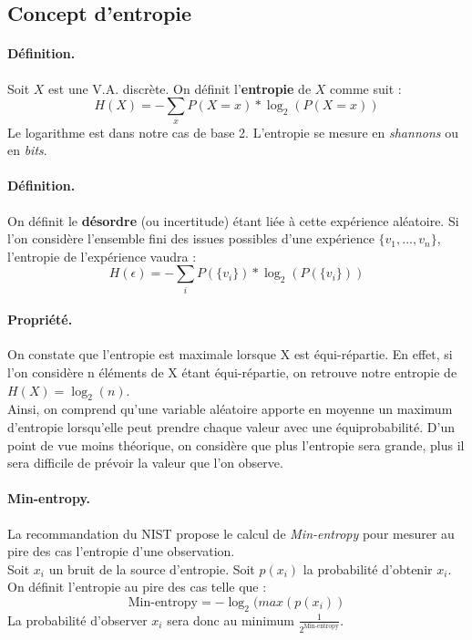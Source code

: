 \subsection{Concept d'entropie}
\paragraph{Définition.\\}
Soit $X$ est une V.A. discrète. On définit l'\textbf{entropie} de $X$ comme suit : 
$$H(X) = - \sum_x P(X=x)*\log_2(P(X=x))	 $$ 
Le logarithme est dans notre cas de base 2. L'entropie se mesure en \textit{shannons} ou en \textit{bits}.\\

\paragraph{Définition.\\}
On définit le \textbf{désordre} (ou incertitude) étant liée à cette expérience aléatoire. Si l'on considère l'ensemble fini des issues possibles d'une expérience $\lbrace v_1,...,v_n \rbrace$, l'entropie de l'expérience vaudra :
$$H(\epsilon) = - \sum_i P(\lbrace v_i \rbrace)*\log_2(P(\lbrace v_i \rbrace))	 $$ 

\paragraph{Propriété.\\} 
On constate que l'entropie est maximale lorsque X est équi-répartie. En effet, si l'on considère n éléments de X étant équi-répartie, on retrouve notre entropie de $H(X) = \log_2(n)$. \\


Ainsi, on comprend qu'une variable aléatoire apporte en moyenne un maximum d'entropie lorsqu'elle peut prendre chaque valeur avec une équiprobabilité. D'un point de vue moins théorique, on considère que plus l'entropie sera grande, plus il sera difficile de prévoir la valeur que l'on observe.

\paragraph{Min-entropy.\\}
La recommandation du NIST propose le calcul de \textit{Min-entropy} pour mesurer au pire des cas l'entropie d'une observation. \\

Soit $x_i$ un bruit de la source d'entropie. Soit $p(x_i)$ la probabilité d'obtenir $x_i$. On définit l'entropie au pire des cas telle que : 
$$\text{Min-entropy}=-\log_2(max(p(x_i))$$
La probabilité d'observer $x_i$ sera donc au minimum $\frac{1}{2^\text{Min-entropy}}$.

